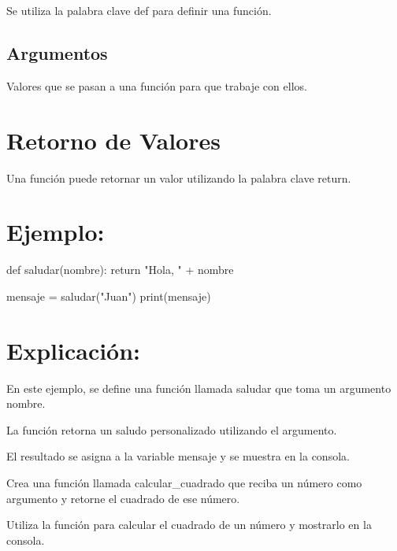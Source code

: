 \documentclass[
  a4paper,
  DIV=11,
  numbers=noendperiod,
  onepage,
  openany]{scrreprt}
\newenvironment{Shaded}{\begin{snugshade}}{\end{snugshade}}
\newcommand{\BuiltInTok}[1]{\textcolor[rgb]{0.00,0.23,0.31}{#1}}
\newcommand{\ControlFlowTok}[1]{\textcolor[rgb]{0.00,0.23,0.31}{#1}}
\newcommand{\KeywordTok}[1]{\textcolor[rgb]{0.00,0.23,0.31}{#1}}
\newcommand{\NormalTok}[1]{\textcolor[rgb]{0.00,0.23,0.31}{#1}}
\newcommand{\OperatorTok}[1]{\textcolor[rgb]{0.37,0.37,0.37}{#1}}
\newcommand{\StringTok}[1]{\textcolor[rgb]{0.13,0.47,0.30}{#1}}
\begin{document}
Se utiliza la palabra clave def para definir una función.

\hypertarget{argumentos-1}{%
\subsection{Argumentos}\label{argumentos-1}}

Valores que se pasan a una función para que trabaje con ellos.

\hypertarget{retorno-de-valores-1}{%
\section{Retorno de Valores}\label{retorno-de-valores-1}}

Una función puede retornar un valor utilizando la palabra clave return.

\hypertarget{ejemplo-45}{%
\section{Ejemplo:}\label{ejemplo-45}}

\begin{Shaded}
\begin{Highlighting}[]
\KeywordTok{def}\NormalTok{ saludar(nombre):}
    \ControlFlowTok{return} \StringTok{"Hola, "} \OperatorTok{+}\NormalTok{ nombre}

\NormalTok{mensaje }\OperatorTok{=}\NormalTok{ saludar(}\StringTok{"Juan"}\NormalTok{)}
\BuiltInTok{print}\NormalTok{(mensaje)}
\end{Highlighting}
\end{Shaded}

\hypertarget{explicaciuxf3n-45}{%
\section{Explicación:}\label{explicaciuxf3n-45}}

En este ejemplo, se define una función llamada saludar que toma un
argumento nombre.

La función retorna un saludo personalizado utilizando el argumento.

El resultado se asigna a la variable mensaje y se muestra en la consola.

\begin{tcolorbox}[enhanced jigsaw, colbacktitle=quarto-callout-important-color!10!white, toprule=.15mm, leftrule=.75mm, titlerule=0mm, opacityback=0, rightrule=.15mm, opacitybacktitle=0.6, breakable, left=2mm, coltitle=black, title=\textcolor{quarto-callout-important-color}{\faExclamation}\hspace{0.5em}{Actividad Práctica:}, toptitle=1mm, bottomtitle=1mm, arc=.35mm, bottomrule=.15mm, colback=white, colframe=quarto-callout-important-color-frame]

Crea una función llamada calcular\_cuadrado que reciba un número como
argumento y retorne el cuadrado de ese número.

Utiliza la función para calcular el cuadrado de un número y mostrarlo en
la consola.

\end{tcolorbox}
\end{document}

